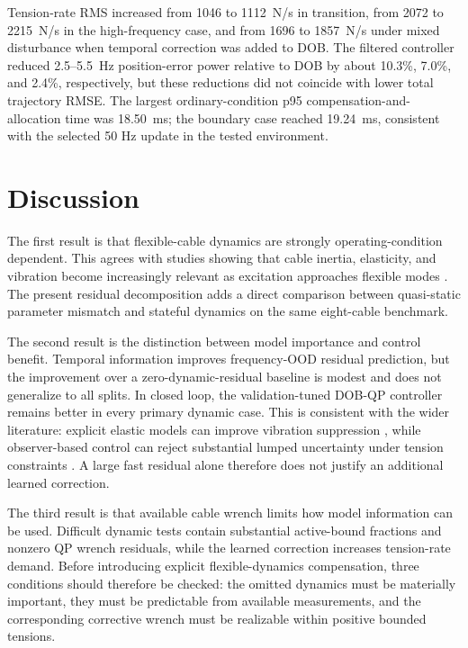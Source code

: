 \documentclass[conference]{IEEEtran}
\begin{document}
Tension-rate RMS increased from 1046 to \SI{1112}{N/s} in transition, from 2072 to \SI{2215}{N/s} in the high-frequency case, and from 1696 to \SI{1857}{N/s} under mixed disturbance when temporal correction was added to DOB. The filtered controller reduced 2.5--\SI{5.5}{Hz} position-error power relative to DOB by about 10.3\%, 7.0\%, and 2.4\%, respectively, but these reductions did not coincide with lower total trajectory RMSE. The largest ordinary-condition p95 compensation-and-allocation time was \SI{18.50}{ms}; the boundary case reached \SI{19.24}{ms}, consistent with the selected 50 Hz update in the tested environment.

\section{Discussion}
The first result is that flexible-cable dynamics are strongly operating-condition dependent. This agrees with studies showing that cable inertia, elasticity, and vibration become increasingly relevant as excitation approaches flexible modes \cite{Peng2023,Saadaoui2025,Rousseau2026}. The present residual decomposition adds a direct comparison between quasi-static parameter mismatch and stateful dynamics on the same eight-cable benchmark.

The second result is the distinction between model importance and control benefit. Temporal information improves frequency-OOD residual prediction, but the improvement over a zero-dynamic-residual baseline is modest and does not generalize to all splits. In closed loop, the validation-tuned DOB-QP controller remains better in every primary dynamic case. This is consistent with the wider literature: explicit elastic models can improve vibration suppression \cite{Rousseau2026,Bellila2026}, while observer-based control can reject substantial lumped uncertainty under tension constraints \cite{Gao2025}. A large fast residual alone therefore does not justify an additional learned correction.

The third result is that available cable wrench limits how model information can be used. Difficult dynamic tests contain substantial active-bound fractions and nonzero QP wrench residuals, while the learned correction increases tension-rate demand. Before introducing explicit flexible-dynamics compensation, three conditions should therefore be checked: the omitted dynamics must be materially important, they must be predictable from available measurements, and the corresponding corrective wrench must be realizable within positive bounded tensions.
\end{document}
